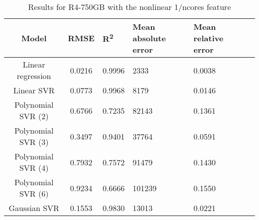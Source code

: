\begin{table}[H]
\centering
\begin{adjustbox}{center}
\begin{tabular}{c | c M{1.2cm} M{2.5cm} M{2.5cm} M{1.8cm}}
Model & RMSE & R\textsuperscript{2} & Mean absolute error & Mean relative error \tabularnewline
\hline
Linear regression & 0.0216 & 0.9996 &   2333 & 0.0038 \\
Linear SVR & 0.0773 & 0.9968 &   8179 & 0.0146 \\
Polynomial SVR (2) & 0.6766 & 0.7235 &  82143 & 0.1361 \\
Polynomial SVR (3) & 0.3497 & 0.9401 &  37764 & 0.0591 \\
Polynomial SVR (4) & 0.7932 & 0.7572 &  91479 & 0.1430 \\
Polynomial SVR (6) & 0.9234 & 0.6666 & 101239 & 0.1550 \\
Gaussian SVR & 0.1553 & 0.9830 &  13013 & 0.0221 \\
\end{tabular}
\end{adjustbox}
\\
\caption{Results for R4-750GB with the nonlinear 1/ncores feature}
\label{tab:all_nonlinear_R4_750}
\end{table}
